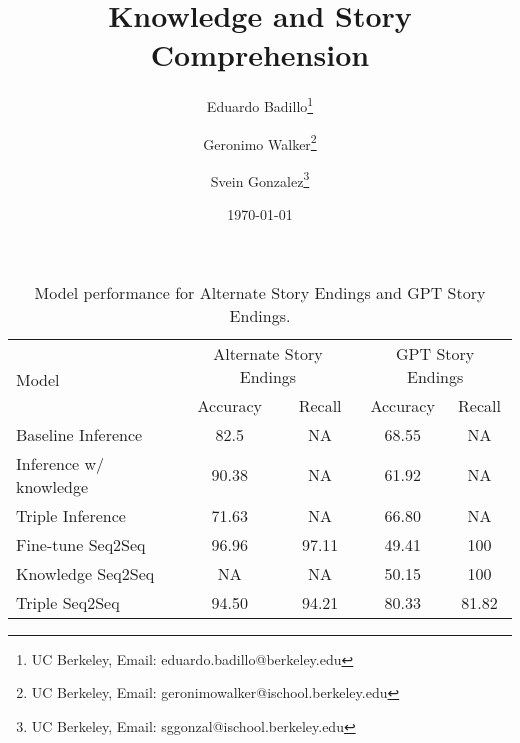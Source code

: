 \documentclass{article}
\title{Knowledge and Story Comprehension}
\author{Eduardo Badillo\thanks{UC Berkeley, Email: eduardo.badillo@berkeley.edu} \and Geronimo Walker\thanks{UC Berkeley, Email: 
geronimowalker@ischool.berkeley.edu} \and   Svein Gonzalez\thanks{UC Berkeley, Email: 
sggonzal@ischool.berkeley.edu}}
\date{\today}
\begin{document}
\maketitle


\begin{table}[h!]
    \centering
    \begin{tabular}{lcccc}
    \hline
    \multirow{2}{*}{Model} & \multicolumn{2}{c}{Alternate Story Endings} & \multicolumn{2}{c}{GPT Story Endings} \\
    & Accuracy & Recall & Accuracy & Recall \\
    \hline
    Baseline Inference & 82.5 & NA & 68.55 & NA \\
    Inference w/ knowledge & 90.38 & NA & 61.92 & NA \\
    Triple Inference & 71.63 & NA & 66.80 & NA \\
    \hline
    Fine-tune Seq2Seq & 96.96 & 97.11 & 49.41 & 100 \\
    Knowledge Seq2Seq & NA & NA & 50.15 & 100 \\
    Triple Seq2Seq & 94.50 & 94.21 & 80.33 & 81.82 \\
    
    \end{tabular}
    \caption{Model performance for Alternate Story Endings and GPT Story Endings.}
    \label{tab:model_performance}
    \end{table}
    
\end{document}
